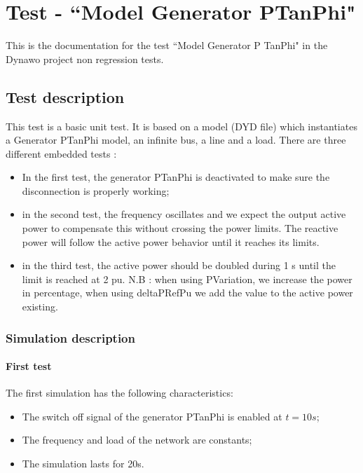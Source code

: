 \documentclass[a4paper, 12pt]{report}
\begin{document}
\chapter*{Test - ``Model Generator PTanPhi"}
This is the documentation for the test ``Model Generator P TanPhi" in the Dynawo project non regression tests.

\section*{Test description}

This test is a basic unit test. It is based on a model (DYD
file) which instantiates a Generator PTanPhi model, an infinite bus, a line and a
load.
There are three different embedded tests  :
\begin{itemize}
\item In the first test, the generator PTanPhi is deactivated to make sure the
disconnection is properly working;
\item in the second test, the frequency oscillates and we expect the output
active power to compensate this without crossing the power limits.
The reactive power will follow the active power behavior until it reaches its limits.
\item in the third test, the active power should be doubled during 1 s until the limit is reached at 2 pu.
N.B : when using PVariation, we increase the power in percentage, when using deltaPRefPu we add the value to the active power existing.

\end{itemize}

\subsection*{Simulation description}

\subsubsection*{First test}
The first simulation has the following characteristics:
\begin{itemize}
\item The switch off signal of the generator PTanPhi is enabled at $t=10s$;
\item The frequency and load of the network are constants;
\item The simulation lasts for 20s.
\end{itemize}
\end{document}
